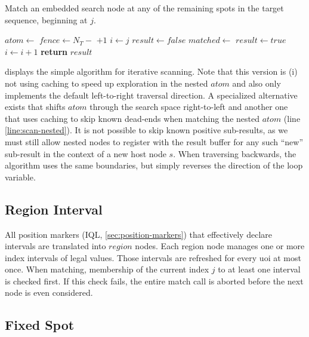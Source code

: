 \documentclass[11pt,a4paper]{report}
\begin{document}
\begin{algorithm}[H]
	\caption[Iterative scan matching]{Match an embedded search node at any of the remaining spots in the target sequence, beginning at $j$.}
	\label{alg:match-scan}
	\begin{algorithmic}[1]
		\State $atom \gets$ 
		\State $fence \gets N_T -$  $ + 1$
		\State $i \gets j$
		\State $result \gets false$
		 
			\State $matched \gets$ \label{line:scan-nested}
				\State $result \gets true$
			\EndIf
			\State $i \gets i +1$
		\EndWhile
		\State \textbf{return} $result$
		\EndProcedure
	\end{algorithmic}
\end{algorithm}

 displays the simple algorithm for iterative scanning.
Note that this version is (i) not using caching to speed up exploration in the nested $atom$ and also only implements the default left-to-right traversal direction.
A specialized alternative exists that shifts $atom$ through the search space right-to-left and another one that uses caching to skip known dead-ends when matching the nested $atom$ (line \ref{line:scan-nested}).
It is not possible to skip known positive sub-results, as we must still allow nested nodes to register with the result buffer for any such ``new'' sub-result in the context of a new host node $s$.
When traversing backwards, the algorithm uses the same boundaries, but simply reverses the direction of the loop variable.

\subsection{Region Interval}
\label{sec:seq-region}

All position markers (IQL, \cref{sec:position-markers}) that effectively declare intervals are translated into $region$ nodes.
Each region node manages one or more index intervals of legal values.
Those intervals are refreshed for every \ac{uoi} at most once.
When matching, membership of the current index $j$ to at least one interval is checked first.
If this check fails, the entire match call is aborted before the next node is even considered.

\subsection{Fixed Spot}
\label{sec:seq-spot}
\end{document}
